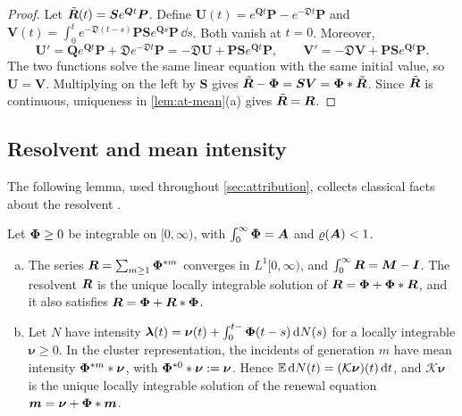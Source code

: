 \begin{proof}
Let $\tilde{\bm{R}}(t)=\bm Se^{\bm Qt}\bm P$. Define
$\bm U(t)=e^{\bm Qt}\bm P-e^{-\bm{\mathfrak D}t}\bm P$ and
$\bm V(t)=\int_0^te^{-\bm{\mathfrak D}(t-s)}\bm P\bm Se^{\bm Qs}\bm P\,\dd s$. Both vanish
at $t=0$. Moreover,
\[
\bm U'=\bm Qe^{\bm Qt}\bm P+\bm{\mathfrak D}e^{-\bm{\mathfrak D}t}\bm P
=-\bm{\mathfrak D}\bm U+\bm P\bm Se^{\bm Qt}\bm P,
\qquad
\bm V'=-\bm{\mathfrak D}\bm V+\bm P\bm Se^{\bm Qt}\bm P .
\]
The two functions solve the same linear equation with the same initial value, so
$\bm U=\bm V$. Multiplying on the left by $\bm S$ gives
$\tilde{\bm{R}}-\bm{\Phi}=\bm S\bm V=\bm{\Phi}*\tilde{\bm{R}}$. Since $\tilde{\bm{R}}$ is continuous,
uniqueness in \cref{lem:at-mean}(a) gives $\tilde{\bm{R}}=\bm{R}$.
\end{proof}

\subsection{Resolvent and mean intensity}\label{app:at-mean}

The following lemma, used throughout \cref{sec:attribution}, collects classical facts
about the resolvent \citep{hawkes1971,gripenberg1990}.

\begin{lemma}\label{lem:at-mean}
Let $\bm{\Phi}\ge0$ be integrable on $[0,\infty)$, with $\int_0^\infty\bm{\Phi}=\bm{A}$ and
$\varrho(\bm{A})<1$.
\begin{enumerate}[(a)]
  \item The series $\bm{R}=\sum_{m\ge1}\bm{\Phi}^{*m}$ converges in $L^1[0,\infty)$, and
  $\int_0^\infty\bm{R}=\bm{M}-\bm{I}$. The resolvent $\bm{R}$ is the unique locally
  integrable solution of $\bm{R}=\bm{\Phi}+\bm{\Phi}*\bm{R}$, and it also satisfies
  $\bm{R}=\bm{\Phi}+\bm{R}*\bm{\Phi}$.
  \item Let $N$ have intensity
  $\bm\lambda(t)=\bm\nu(t)+\int_0^{t-}\bm{\Phi}(t-s)\,\mathrm{d}N(s)$ for a locally integrable
  $\bm\nu\ge0$. In the cluster representation, the incidents of generation $m$ have
  mean intensity $\bm{\Phi}^{*m}*\bm\nu$, with $\bm{\Phi}^{*0}*\bm\nu:=\bm\nu$. Hence
  $\mathbb{E}\,\mathrm{d}N(t)=(\mathcal K\bm\nu)(t)\,\mathrm{d} t$, and $\mathcal K\bm\nu$ is the unique
  locally integrable solution of the renewal equation $\bm m=\bm\nu+\bm{\Phi}*\bm m$.
\end{enumerate}
\end{lemma}

